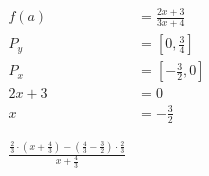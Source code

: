 \begin{align*}
    f(a) &= \frac{2x+3}{3x+4}
     \\P_y &= \left[0,\frac{3}{4}\right]
     \\P_x &= \left[-\frac{3}{2},0\right] 
     \\ 2x+3 &= 0 
     \\ x &= - \frac{3}{2}
     \\ \\ \\ \frac{\frac{2}{3} \cdot \left(x+\frac{4}{3}\right) - \left(\frac{4}{3} - \frac{3}{2}\right) \cdot\frac{2}{3}}{x+\frac{4}{3}}
\end{align*}

